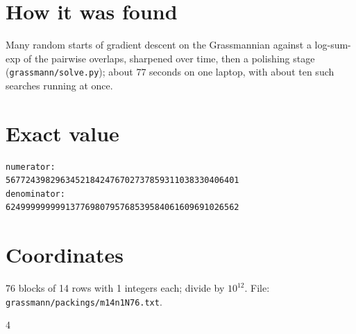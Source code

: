 \documentclass[11pt,a4paper]{article}
\begin{document}
\section{How it was found}
Many random starts of gradient descent on the Grassmannian against a log-sum-exp of the pairwise overlaps, sharpened over time, then a polishing stage (\texttt{grassmann/solve.py}); about 77 seconds on one laptop, with about ten such searches running at once.


\appendix
\section{Exact value}
{\small
\begin{verbatim}
numerator:
56772439829634521842476702737859311038330406401
denominator:
62499999999913776980795768539584061609691026562
\end{verbatim}}

\section{Coordinates}
76 blocks of 14 rows with 1 integers each; divide by $10^{12}$. File: \texttt{grassmann/packings/m14n1N76.txt}.
{\tiny
\begin{multicols}{4}
\end{multicols}}
\end{document}
